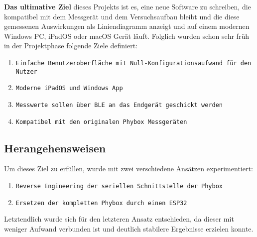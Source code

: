 \textbf{Das ultimative Ziel} dieses Projekts ist es, eine neue Software zu schreiben, die kompatibel mit dem Messgerät und dem Versuchsaufbau bleibt und die diese gemessenen Auswirkungen als Liniendiagramm anzeigt und auf einem modernen Windows \ac{PC}, iPadOS oder macOS Gerät läuft. Folglich wurden schon sehr früh in der Projektphase folgende Ziele definiert:
\begin{enumerate}
    \item \texttt{Einfache Benutzeroberfläche mit Null-Konfigurationsaufwand für den Nutzer}
    \item \texttt{Moderne iPadOS und Windows App}
    \item \texttt{Messwerte sollen über \ac{BLE} an das Endgerät geschickt werden}
    \item \texttt{Kompatibel mit den originalen Phybox Messgeräten}
\end{enumerate}

\subsection{Herangehensweisen}
\label{sec:Herangehensweisen}

Um dieses Ziel zu erfüllen, wurde mit zwei verschiedene Ansätzen experimentiert:
\begin{enumerate}
    \item \texttt{Reverse Engineering der seriellen Schnittstelle der Phybox}
    \item \texttt{Ersetzen der kompletten Phybox durch einen \ac{ESP32}}
\end{enumerate}

Letztendlich wurde sich für den letzteren Ansatz entschieden, da dieser mit weniger Aufwand verbunden ist und deutlich stabilere Ergebnisse erzielen konnte.\\
